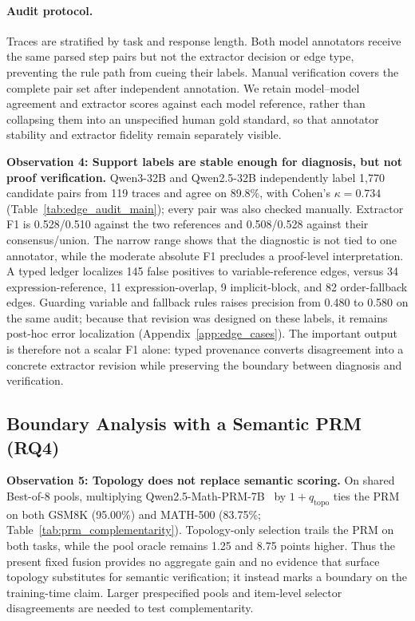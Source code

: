 

\paragraph{Audit protocol.}
Traces are stratified by task and response length. Both model annotators receive the same parsed step pairs but not the extractor decision or edge type, preventing the rule path from cueing their labels. Manual verification covers the complete pair set after independent annotation. We retain model--model agreement and extractor scores against each model reference, rather than collapsing them into an unspecified human gold standard, so that annotator stability and extractor fidelity remain separately visible.

\noindent\textbf{Observation 4: Support labels are stable enough for diagnosis, but not proof verification.}
Qwen3-32B and Qwen2.5-32B independently label 1{,}770 candidate pairs from 119 traces and agree on 89.8\%, with Cohen's $\kappa=0.734$ (Table~\ref{tab:edge_audit_main}); every pair was also checked manually. Extractor F1 is 0.528/0.510 against the two references and 0.508/0.528 against their consensus/union. The narrow range shows that the diagnostic is not tied to one annotator, while the moderate absolute F1 precludes a proof-level interpretation. A typed ledger localizes 145 false positives to variable-reference edges, versus 34 expression-reference, 11 expression-overlap, 9 implicit-block, and 82 order-fallback edges. Guarding variable and fallback rules raises precision from 0.480 to 0.580 on the same audit; because that revision was designed on these labels, it remains post-hoc error localization (Appendix~\ref{app:edge_cases}).
The important output is therefore not a scalar F1 alone: typed provenance converts disagreement into a concrete extractor revision while preserving the boundary between diagnosis and verification.

\subsection{Boundary Analysis with a Semantic PRM (RQ4)}
\label{sec:rq4}



\noindent\textbf{Observation 5: Topology does not replace semantic scoring.}
On shared Best-of-8 pools, multiplying Qwen2.5-Math-PRM-7B~\citep{zhang2025qwen25mathprm} by $1+q_{\mathrm{topo}}$ ties the PRM on both GSM8K (95.00\%) and MATH-500 (83.75\%; Table~\ref{tab:prm_complementarity}). Topology-only selection trails the PRM on both tasks, while the pool oracle remains 1.25 and 8.75 points higher. Thus the present fixed fusion provides no aggregate gain and no evidence that surface topology substitutes for semantic verification; it instead marks a boundary on the training-time claim. Larger prespecified pools and item-level selector disagreements are needed to test complementarity.

